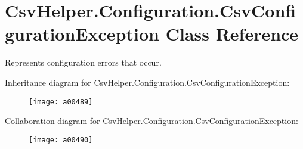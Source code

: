 \hypertarget{a00066}{\section{Csv\-Helper.\-Configuration.\-Csv\-Configuration\-Exception Class Reference}
\label{a00066}
}


Represents configuration errors that occur.  




Inheritance diagram for Csv\-Helper.\-Configuration.\-Csv\-Configuration\-Exception\-:
\nopagebreak
\begin{figure}[H]
\begin{center}
\leavevmode
\texttt{[image: a00489]}
\end{center}
\end{figure}


Collaboration diagram for Csv\-Helper.\-Configuration.\-Csv\-Configuration\-Exception\-:
\nopagebreak
\begin{figure}[H]
\begin{center}
\leavevmode
\texttt{[image: a00490]}
\end{center}
\end{figure}
